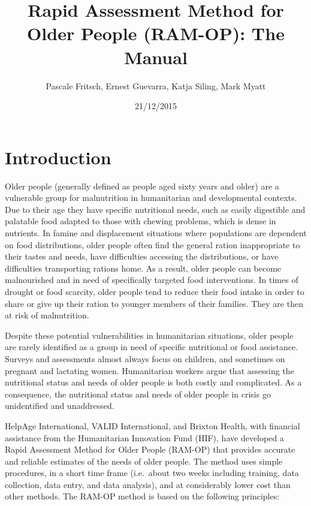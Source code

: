 \documentclass[12pt,]{book}
\title{Rapid Assessment Method for Older People (RAM-OP): The Manual}
\author{Pascale Fritsch, Ernest Guevarra, Katja Siling, Mark Myatt}
\date{21/12/2015}
\theoremstyle{definition}
\theoremstyle{definition}
\theoremstyle{definition}
\theoremstyle{remark}
\begin{document}
\maketitle

{
\setcounter{tocdepth}{1}
\tableofcontents
}
\hypertarget{introduction}{%
\chapter{Introduction}\label{introduction}}

Older people (generally defined as people aged sixty years and older)
are a vulnerable group for malnutrition in humanitarian and
developmental contexts. Due to their age they have specific nutritional
needs, such as easily digestible and palatable food adapted to those
with chewing problems, which is dense in nutrients. In famine and
displacement situations where populations are dependent on food
distributions, older people often find the general ration inappropriate
to their tastes and needs, have difficulties accessing the
distributions, or have difficulties transporting rations home. As a
result, older people can become malnourished and in need of specifically
targeted food interventions. In times of drought or food scarcity, older
people tend to reduce their food intake in order to share or give up
their ration to younger members of their families. They are then at risk
of malnutrition.

Despite these potential vulnerabilities in humanitarian situations,
older people are rarely identified as a group in need of specific
nutritional or food assistance. Surveys and assessments almost always
focus on children, and sometimes on pregnant and lactating women.
Humanitarian workers argue that assessing the nutritional status and
needs of older people is both costly and complicated. As a consequence,
the nutritional status and needs of older people in crisis go
unidentified and unaddressed.

HelpAge International, VALID International, and Brixton Health, with
financial assistance from the Humanitarian Innovation Fund (HIF), have
developed a Rapid Assessment Method for Older People (RAM-OP) that
provides accurate and reliable estimates of the needs of older people.
The method uses simple procedures, in a short time frame (i.e.~about two
weeks including training, data collection, data entry, and data
analysis), and at considerably lower cost than other methods. The RAM-OP
method is based on the following principles:
\end{document}
